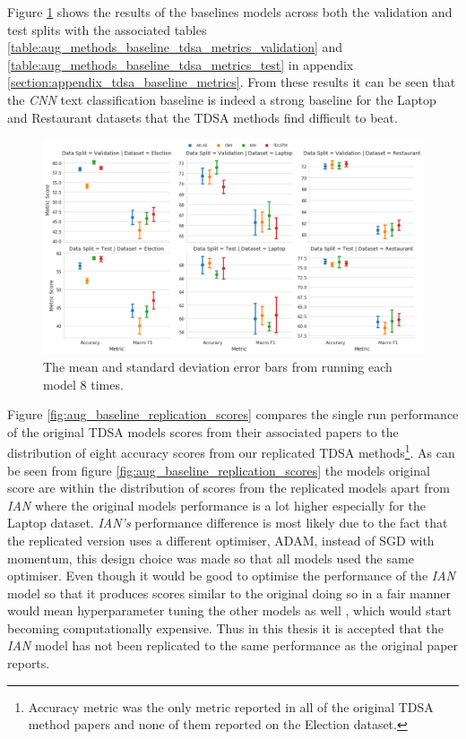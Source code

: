 Figure \ref{fig:aug_baseline_overall_scores} shows the results of the baselines models across both the validation and test splits with the associated tables \ref{table:aug_methods_baseline_tdsa_metrics_validation} and \ref{table:aug_methods_baseline_tdsa_metrics_test} in appendix \ref{section:appendix_tdsa_baseline_metrics}. From these results it can be seen that the \textit{CNN} text classification baseline is indeed a strong baseline for the Laptop and Restaurant datasets that the TDSA methods find difficult to beat. 

\begin{figure}[ht!]
    \centering
    \includegraphics[scale=0.3]{images/augmentation/methods_performance/baseline/baseline_overall_scores.png}
    \caption{The mean and standard deviation error bars from running each model 8 times.}
    \label{fig:aug_baseline_overall_scores}
\end{figure}

Figure \ref{fig:aug_baseline_replication_scores} compares the single run performance of the original TDSA models scores from their associated papers to the distribution of eight accuracy scores from our replicated TDSA methods\footnote{Accuracy metric was the only metric reported in all of the original TDSA method papers and none of them reported on the Election dataset.}. As can be seen from figure \ref{fig:aug_baseline_replication_scores} the models original score are within the distribution of scores from the replicated models apart from \textit{IAN} where the original models performance is a lot higher especially for the Laptop dataset. \textit{IAN's} performance difference is most likely due to the fact that the replicated version uses a different optimiser, ADAM, instead of SGD with momentum, this design choice was made so that all models used the same optimiser. Even though it would be good to optimise the performance of the \textit{IAN} model so that it produces scores similar to the original doing so in a fair manner would mean hyperparameter tuning the other models as well \citep{repro_Dodge2019ShowYW}, which would start becoming computationally expensive. Thus in this thesis it is accepted that the \textit{IAN} model has not been replicated to the same performance as the original paper reports.

